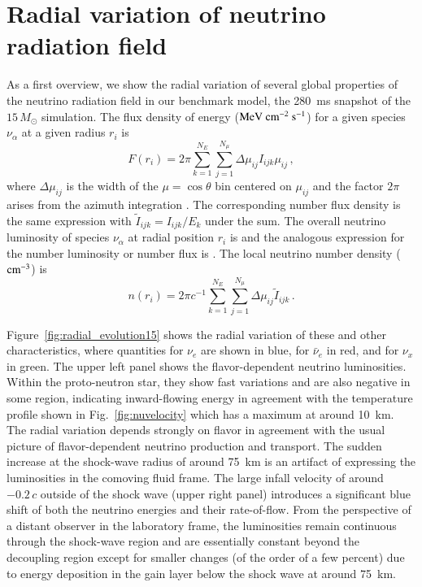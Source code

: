 \documentclass[iop,twocolappendix,numberedappendix]{emulateapj}
\begin{document}
\section{Radial variation of neutrino radiation field}\label{sec:radial}

As a first overview, we show the radial variation of several global
properties of the neutrino radiation field in our benchmark model, the 280~ms
snapshot of the $15\,M_\odot$ simulation. The flux density of energy (${\rm
MeV}~{\rm cm}^{-2}~{\rm s}^{-1}$) for a given species $\nu_\alpha$ at a given
radius $r_i$ is
\begin{equation}
\label{eq:number}
{F}(r_i)= 2 \pi \sum_{k=1}^{N_E} \sum_{j=1}^{N_{\mu}} \Delta\mu_{ij} {I}_{ijk} \mu_{ij}\,,
\end{equation}
where $\Delta\mu_{ij}$ is the width of the $\mu=\cos\theta$ bin centered
on $\mu_{ij}$ and the factor $2\pi$ arises from the azimuth integration
. The corresponding number flux density
 is the same expression with
$\tilde{I}_{ijk}={I}_{ijk}/E_k$ under the sum. The overall neutrino
luminosity of species $\nu_\alpha$  at
radial position $r_i$ is  and the
analogous expression for the number luminosity or number flux  is . The local
neutrino number density (${\rm cm}^{-3}$) is
\begin{equation}
\label{eq:density}
n(r_i)= 2 \pi c^{-1} \sum_{k=1}^{N_E} \sum_{j=1}^{N_{\mu}} \Delta\mu_{ij} \tilde{I}_{ijk}\,.
\end{equation}

Figure~\ref{fig:radial_evolution15} shows the radial variation of these and
other characteristics, where quantities for $\nu_e$ are shown in blue, for
$\bar{\nu}_e$ in red, and for $\nu_x$ in green.
The upper left panel shows the flavor-dependent neutrino luminosities. Within
the proto-neutron star, they show fast variations and are also negative in
some region, indicating inward-flowing energy in agreement with the
temperature profile shown in Fig.~\ref{fig:nuvelocity} which has a maximum at
around 10~km. The radial variation depends strongly on flavor in agreement
with the usual picture of flavor-dependent neutrino production and transport.
The sudden increase at the shock-wave radius of around 75~km is an artifact
of expressing the luminosities in the comoving fluid frame. The large infall
velocity of around $-0.2\,c$ outside of the shock wave (upper right panel)
introduces a significant blue shift of both the neutrino energies and their
rate-of-flow. From the perspective of a distant observer in the laboratory
frame, the luminosities
remain continuous through the shock-wave region and are essentially constant
beyond the decoupling region except for smaller changes (of the order of a few
percent) due to energy deposition in the gain layer
below the shock wave at around 75~km.
\end{document}
